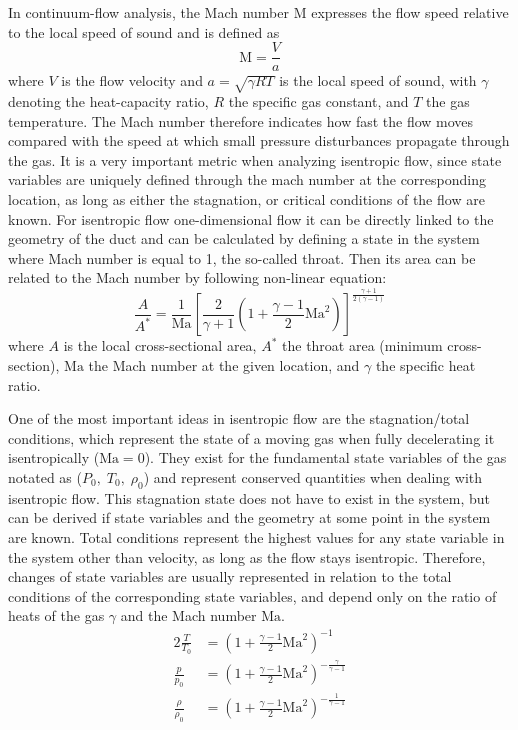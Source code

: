 	In continuum-flow analysis, the Mach number $\mathrm{M}$ expresses the flow speed relative to the local speed of sound and is defined as
	\begin{equation}
		\mathrm{M} = \frac{V}{a}
		\label{eq:mach-number}
	\end{equation}
	where $V$ is the flow velocity and $a = \sqrt{\gamma R T}$ is the local speed of sound, with $\gamma$ denoting the heat-capacity ratio, $R$ the specific gas constant, and $T$ the gas temperature.
	The Mach number therefore indicates how fast the flow moves compared with the speed at which small pressure disturbances propagate through the gas.
	It is a very important metric when analyzing isentropic flow, since state variables are uniquely defined through the mach number at the corresponding location, as long as either the stagnation, or critical conditions of the flow are known.
	For isentropic flow one-dimensional flow it can be directly linked to the geometry of the duct and can be calculated by defining a state in the system where Mach number is equal to 1, the so-called throat.
	Then its area can be related to the Mach number by following non-linear equation:
	\begin{equation}
		\frac{A}{A^*} = \frac{1}{\mathrm{Ma}} \left[ \frac{2}{\gamma + 1} \left( 1 + \frac{\gamma - 1}{2} \mathrm{Ma}^2 \right) \right]^{\frac{\gamma + 1}{2(\gamma - 1)}}
		\label{eq:area_ratio_mach}
	\end{equation}
	where $A$ is the local cross-sectional area, $A^*$ the throat area (minimum cross-section), $\mathrm{Ma}$ the Mach number at the given location, and $\gamma$ the specific heat ratio.

	One of the most important ideas in isentropic flow are the stagnation/total conditions, which represent the state of a moving gas when fully decelerating it isentropically ($\mathrm{Ma} = 0$).
	They exist for the fundamental state variables of the gas notated as ($P_0,\;T_0,\;\rho_0$) and represent conserved quantities when dealing with isentropic flow.
	This stagnation state does not have to exist in the system, but can be derived if state variables and the geometry at some point in the system are known.
	Total conditions represent the highest values for any state variable in the system other than velocity, as long as the flow stays isentropic.
	Therefore, changes of state variables are usually represented in relation to the total conditions of the corresponding state variables, and depend only on the ratio of heats of the gas $\gamma$ and the Mach number $\mathrm{Ma}$.
	\begin{alignat}{2}
	    \frac{T}{T_0}   & = \left( 1 + \frac{\gamma - 1}{2} \mathrm{Ma}^2 \right)^{-1} \label{eq:total_relation_T}\\
	    \frac{p}{p_0}   & = \left( 1 + \frac{\gamma - 1}{2} \mathrm{Ma}^2 \right)^{-\frac{\gamma}{\gamma - 1}} \label{eq:total_relation_p}\\
	    \frac{\rho}{\rho_0} & = \left( 1 + \frac{\gamma - 1}{2} \mathrm{Ma}^2 \right)^{-\frac{1}{\gamma - 1}} \label{eq:total_relation_rho}
	\end{alignat}

